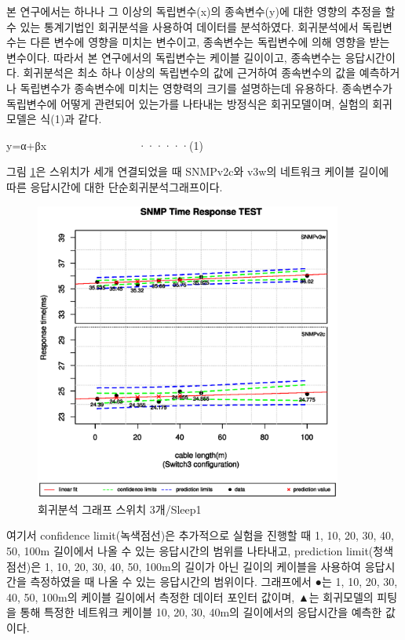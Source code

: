 \documentclass[11pt
  , a4paper
  , article
  , oneside
]{memoir}
\begin{document}
본 연구에서는 하나나 그 이상의 독립변수(x)의 종속변수(y)에 대한 영향의 추정을 할 수 있는 통계기법인 회귀분석을 사용하여 데이터를 분석하였다\citep{analysis}. 회귀분석에서 독립변수는 다른 변수에 영향을 미치는 변수이고, 종속변수는 독립변수에 의해 영향을 받는 변수이다. 따라서 본 연구에서의 독립변수는 케이블 길이이고, 종속변수는 응답시간이다. 회귀분석은 최소 하나 이상의 독립변수의 값에 근거하여 종속변수의 값을 예측하거나 독립변수가 종속변수에 미치는 영향력의 크기를 설명하는데 유용하다. 종속변수가 독립변수에 어떻게 관련되어 있는가를 나타내는 방정식은 회귀모델이며, 실험의 회귀모델은 식(1)과 같다. 

y=α+βx　　　　　　　　 ······(1)

그림 \ref{fig:s3s1}은 스위치가 세개 연결되었을 때 SNMPv2c와 v3w의 네트워크 케이블 길이에 따른 응답시간에 대한 단순회귀분석그래프이다. 

\begin{figure}[!htb]
  \centering
  \includegraphics[width=0.9\textwidth]{./images/s3s1.eps}
  \caption{회귀분석 그래프 스위치 3개/Sleep1}
  \label{fig:s3s1}   
\end{figure}

여기서 confidence limit(녹색점선)은 추가적으로 실험을 진행할 때 1, 10, 20, 30, 40, 50, 100m 길이에서 나올 수 있는 응답시간의 범위를 나타내고, prediction limit(청색점선)은 1, 10, 20, 30, 40, 50, 100m의 길이가 아닌 길이의 케이블을 사용하여 응답시간을 측정하였을 때 나올 수 있는 응답시간의 범위이다. 그래프에서 ●는 1, 10, 20, 30, 40, 50, 100m의 케이블 길이에서 측정한 데이터 포인터 값이며, ▲는 회귀모델의 피팅을 통해 특정한 네트워크 케이블 10, 20, 30, 40m의 길이에서의 응답시간을 예측한 값이다. 
\end{document}
